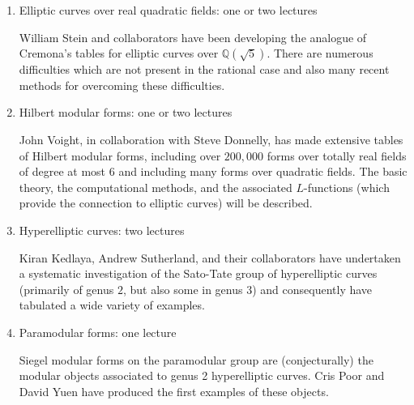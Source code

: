 \documentclass[12pt]{amsart}
\numberwithin{equation}{section}
\newcommand{\Q}{\mathbb Q}
\begin{document}
\begin{enumerate}
\item  Elliptic curves over real quadratic fields: one or two lectures

\noindent
William Stein and collaborators have been developing the analogue of
Cremona's tables for elliptic curves over $\Q(\sqrt{5})$.  There are
numerous difficulties which are not present in the rational case
and also many recent methods for overcoming these difficulties.


\item Hilbert modular forms: one or two lectures

\noindent
John Voight, in collaboration with Steve Donnelly, 
has made extensive tables of Hilbert modular forms,
including over $200{,}000$ forms over totally real fields of degree at
most $6$ and including 
many forms over quadratic fields.  The basic
theory, the computational methods, and the associated $L$-functions
(which provide the connection to elliptic curves) will be
described.


\item  Hyperelliptic curves: two lectures

\noindent
Kiran Kedlaya, Andrew Sutherland, and their collaborators have
undertaken a systematic investigation of the Sato-Tate group of 
hyperelliptic curves (primarily of genus $2$, but also some in genus $3$)
and consequently have tabulated a wide variety
of examples.



\item  Paramodular forms: one lecture

\noindent
Siegel modular forms on the paramodular group are (conjecturally) the
modular objects associated to genus 2 hyperelliptic curves.
Cris Poor and David Yuen have produced the first examples of these
objects.  


\end{enumerate}
\end{document}
